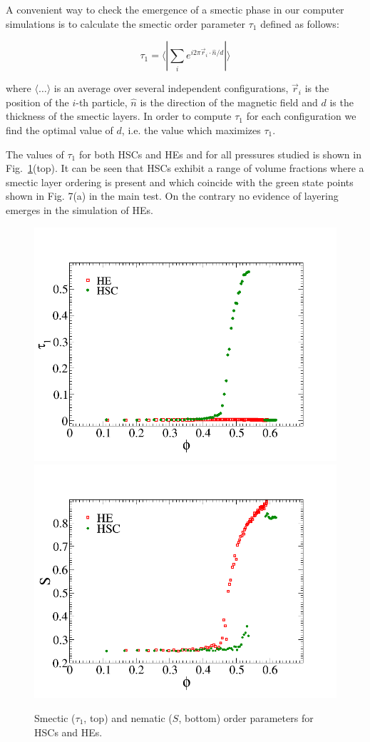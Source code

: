 \documentclass[aip,graphicx]{revtex4-1}
\begin{document}
A convenient way to check the emergence of a smectic phase in our computer simulations 
is to calculate the smectic order parameter $\tau_1$ defined as follows:

\begin{equation}
    \tau_1 = \langle | \sum_i e^{i 2\pi \vec{r}_i \cdot \hat{n} / d } |\rangle 
\end{equation}

where $\langle\ldots\rangle$ is an average over several independent configurations, $\vec{r}_i$ is the position of the $i$-th particle, $\hat{n}$ is the direction of the magnetic
field and $d$ is the thickness of the smectic layers.
In order to compute $\tau_1$ for each configuration we find the optimal value of $d$, i.e. 
the value which maximizes $\tau_1$.

The values of $\tau_1$ for both HSCs and HEs and for all pressures studied is shown in Fig.~\ref{fig:ordpars}(top). It can be seen that HSCs exhibit a range of volume fractions where 
a smectic layer ordering is present and which coincide with the green state points shown in Fig. 7(a)
in the main test. On the contrary no evidence of layering emerges in the simulation of HEs.

\begin{figure}
    \centering
    \includegraphics[width=0.7\columnwidth]{smordpar.png}
    \includegraphics[width=0.7\columnwidth]{nemop.png}  
    \caption{Smectic ($\tau_1$, top) and nematic ($S$, bottom) order parameters for HSCs and HEs.}
    \label{fig:ordpars}
\end{figure}
\end{document}

